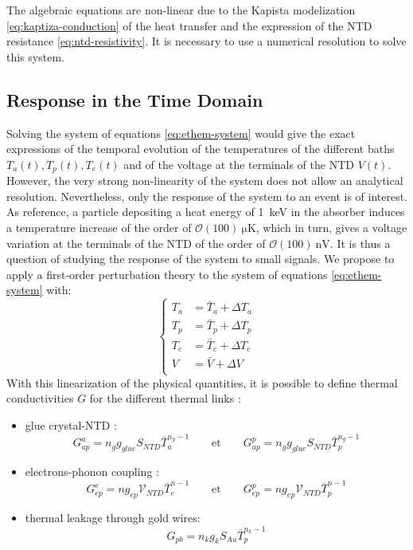 The algebraic equations are non-linear due to the Kapista modelization \ref{eq:kaptiza-conduction} of the heat transfer and the expression of the NTD resistance \ref{eq:ntd-resistivity}. It is necessary to use a numerical resolution to solve this system. 

\subsection{Response in the Time Domain}
\label{par:time-domain}

Solving the system of equations \ref{eq:ethem-system} would give the exact expressions of the temporal evolution of the temperatures of the different baths $T_a(t), T_p(t), T_e(t)$ and of the voltage at the terminals of the NTD $V(t)$.
However, the very strong non-linearity of the system does not allow an analytical resolution.
Nevertheless, only the response of the system to an event is of interest. As reference, a particle depositing a heat energy of \SI{1}{\kilo\eV} in the absorber induces a temperature increase of the order of $\mathcal{O}(100)\ \si{\micro\kelvin}$, which in turn, gives a voltage variation at the terminals of the NTD of the order of $\mathcal{O}(100)\ \si{\nano\volt}$. 
It is thus a question of studying the response of the system to small signals. We propose to apply a first-order perturbation theory to the system of equations \ref{eq:ethem-system} with:
\begin{equation}
\label{eq:linearization}
\begin{cases}
T_a &= \bar{T}_a + \Delta T_a \\
T_p &= \bar{T}_p + \Delta T_p \\
T_e &= \bar{T}_e + \Delta T_e \\
V &= \bar{V} + \Delta V \\
\end{cases}
\end{equation}
With this linearization of the physical quantities, it is possible to define thermal conductivities $G$ for the different thermal links :
\begin{itemize}
\item glue crystal-NTD : \begin{equation}\label{eq:g1} G_{ap}^a  = n_g g_{glue} S_{NTD} \bar{T}_a^{n_g-1} \qquad \textrm{et} \qquad G_{ap}^p  = n_g g_{glue} S_{NTD} \bar{T}_p^{n_g-1}
\end{equation}
\item electrons-phonon coupling : \begin{equation}\label{eq:g2} G_{ep}^e  = n g_{ep} \mathcal{V}_{NTD} \bar{T}_e^{n-1} \qquad \textrm{et} \qquad G_{ep}^p  = n g_{ep} \mathcal{V}_{NTD} \bar{T}_p^{n-1}
\end{equation}
\item thermal leakage through gold wires: \begin{equation}\label{eq:g3} G_{pb} = n_k g_{k} S_{Au} \bar{T}_p^{n_k-1}
\end{equation}
\end{itemize}
